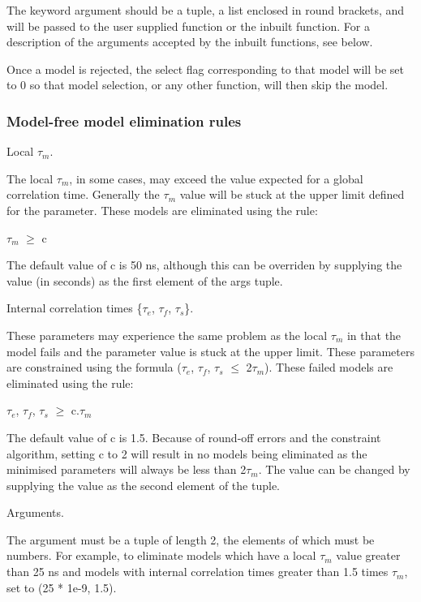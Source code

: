 The 
 keyword argument should be a tuple, a list enclosed in round brackets, and will
be passed to the user supplied function or the inbuilt function.  For a description of the
arguments accepted by the inbuilt functions, see below.

Once a model is rejected, the select flag corresponding to that model will be set to 0 so
that model selection, or any other function, will then skip the model.



\subsubsection{Model-free model elimination rules}

Local $\tau_m$.

The local $\tau_m$, in some cases, may exceed the value expected for a global correlation time.
Generally the $\tau_m$ value will be stuck at the upper limit defined for the parameter.  These
models are eliminated using the rule:

    $\tau_m$ $\ge$ c

The default value of c is 50 ns, although this can be overriden by supplying the value (in
seconds) as the first element of the args tuple.


Internal correlation times \{$\tau_e$, $\tau_f$, $\tau_s$\}.

These parameters may experience the same problem as the local $\tau_m$ in that the model fails and
the parameter value is stuck at the upper limit.  These parameters are constrained using the
formula ($\tau_e$, $\tau_f$, $\tau_s$ $\le$ 2$\tau_m$).  These failed models are eliminated using the rule:

    $\tau_e$, $\tau_f$, $\tau_s$ $\ge$ c.$\tau_m$

The default value of c is 1.5.  Because of round-off errors and the constraint algorithm,
setting c to 2 will result in no models being eliminated as the minimised parameters will
always be less than 2$\tau_m$.  The value can be changed by supplying the value as the second
element of the tuple.


Arguments.

The 
 argument must be a tuple of length 2, the elements of which must be numbers.  For
example, to eliminate models which have a local $\tau_m$ value greater than 25 ns and models with
internal correlation times greater than 1.5 times $\tau_m$, set 
 to (25 * 1e-9, 1.5).


